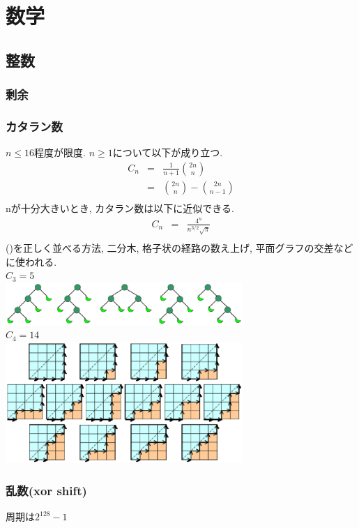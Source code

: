 
\section{数学}
\subsection{整数}
\subsubsection{剰余}


\subsubsection{カタラン数}
$n\leq 16$程度が限度. $n\geq 1$について以下が成り立つ.
\begin{eqnarray*}
  C_n &=& \frac{1}{n+1}\binom{2n}{n}\\
      &=& \binom{2n}{n}-\binom{2n}{n-1}\\
\end{eqnarray*}
nが十分大きいとき, カタラン数は以下に近似できる.
\begin{eqnarray*}
  C_n &=& \frac{4^n}{n^{3/2}\sqrt{\pi}}\\
\end{eqnarray*}
()を正しく並べる方法, 二分木, 格子状の経路の数え上げ, 平面グラフの交差などに使われる.\\
$C_3=5$\\
\includegraphics[width=9cm, clip]{images/Catalan_tree.eps}\\
$C_4=14$\\
\includegraphics[width=9cm, clip]{images/Catalan_graph.eps}\\

\subsubsection{乱数(xor shift)}
周期は$2^{128}-1$


